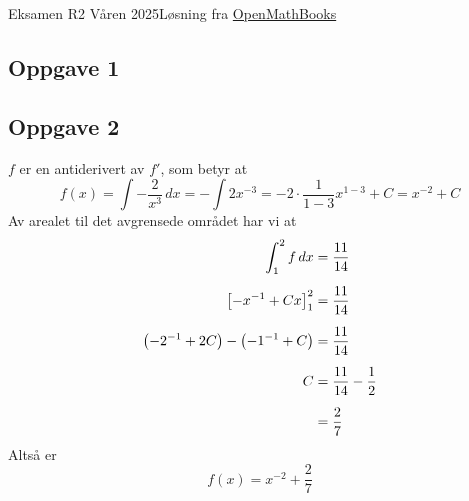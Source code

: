 





{\Large Eksamen R2 Våren 2025\hfill  {\footnotesize Løsning fra \color{blue} \href{https://sindreheggen.wordpress.com/}{OpenMathBooks}}}	

\subsection*{Oppgave 1}

\subsection*{Oppgave 2}
$f$ er en antiderivert av $f'$, som betyr at
\[ f(x)=\int -\frac{2}{x^3}\,dx=-\int 2x^{-3}=-2\cdot\frac{1}{1-3}x^{1-3}+C=x^{-2}+C \]
Av arealet til det avgrensede området har vi at
\begin{align}
\int_{1}^{2} f\,dx &= \frac{11}{14} \br
\left[-x^{-1}+Cx\right]_1^2 &= \frac{11}{14} \br
\left(-2^{-1}+2C\right)-\left(-1^{-1}+C\right) &= \frac{11}{14} \br
C&=\frac{11}{14}-\frac{1}{2} \br
&=\frac{2}{7}
\end{align}
Altså er
\[ f(x)=x^{-2}+\frac{2}{7} \]

